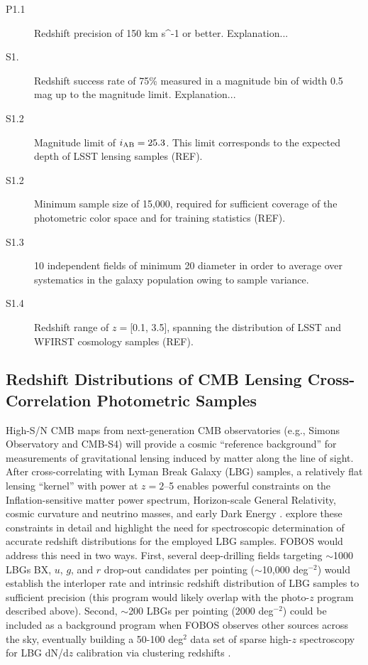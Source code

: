 \documentclass[preprint,11pt]{aastex}
\newcommand{\kms}{{\rm km s^{-1}}}
\begin{document}
\begin{description}

\item[P1.1] Redshift precision of 150 \kms{} or better.  Explanation...

\item[S1.]  Redshift success rate of 75\% measured in a magnitude bin of width 0.5 mag up to the magnitude limit.  Explanation...

\item[S1.2] Magnitude limit of $i_{\rm AB} = 25.3$.  This limit corresponds to the expected depth of LSST lensing samples (REF).

\item[S1.2] Minimum sample size of 15,000, required for sufficient coverage of the photometric color space and for training statistics (REF).

\item[S1.3] 10 independent fields of minimum 20\arcmin{} diameter in order to average over systematics in the galaxy population owing to sample variance.

\item[S1.4] Redshift range of $z = $[0.1, 3.5], spanning the distribution of LSST and WFIRST cosmology samples (REF).

\end{description}



\subsection{Redshift Distributions of CMB Lensing Cross-Correlation Photometric Samples}

High-S/N CMB maps from next-generation CMB observatories (e.g., Simons Observatory and CMB-S4) will provide a cosmic
``reference background'' for measurements of gravitational lensing induced by matter along the line of sight.  After
cross-correlating with Lyman Break Galaxy (LBG) samples, a relatively flat lensing ``kernel'' with power at $z = 2$--5
enables powerful constraints on the Inflation-sensitive matter power spectrum, Horizon-scale General Relativity, cosmic
curvature and neutrino masses, and early Dark Energy \citep{ferraro19}.  \citet{wilson19} explore these constraints in
detail and highlight the need for spectroscopic determination of accurate redshift distributions for the employed LBG
samples. FOBOS would address this need in two ways.  First, several deep-drilling fields targeting $\sim$1000 LBGs BX,
$u$, $g$, and $r$ drop-out candidates per pointing ($\sim$10,000 deg$^{-2}$) would establish the interloper rate and
intrinsic redshift distribution of LBG samples to sufficient precision (this program would likely overlap with the
photo-$z$ program described above).  Second, $\sim$200 LBGs per pointing (2000 deg$^{-2}$) could be included as a
background program when FOBOS observes other sources across the sky, eventually building a 50-100 deg$^2$ data set of
sparse high-$z$ spectroscopy for LBG dN/d$z$ calibration via clustering redshifts \citep[see][]{wilson19}.
\end{document}
